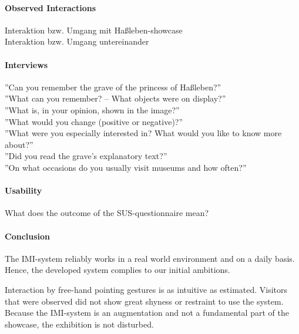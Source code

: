 
\paragraph{Observed Interactions}

Interaktion bzw. Umgang mit Haßleben-showcase
\\
Interaktion bzw. Umgang untereinander


\paragraph{Interviews}

''Can you remember the grave of the princess of Haßleben?''
\\
''What can you remember? -- What objects were on display?''
\\
''What is, in your opinion, shown in the image?''
\\
''What would you change (positive or negative)?''
\\
''What were you especially interested in? What would you like to know more about?''
\\
''Did you read the grave's explanatory text?''
\\
''On what occasions do you usually visit museums and how often?''


\paragraph{Usability}

What does the outcome of the \ac{SUS}-questionnaire mean?


\paragraph{Conclusion}

The \ac{IMI}-system reliably works in a real world environment and on a daily basis. Hence, the developed system complies to our initial ambitions.

Interaction by free-hand pointing gestures is as intuitive as estimated. Visitors that were observed did not show great shyness or restraint to use the system. Because the \ac{IMI}-system is an augmentation and not a fundamental part of the showcase, the exhibition is not disturbed. 

